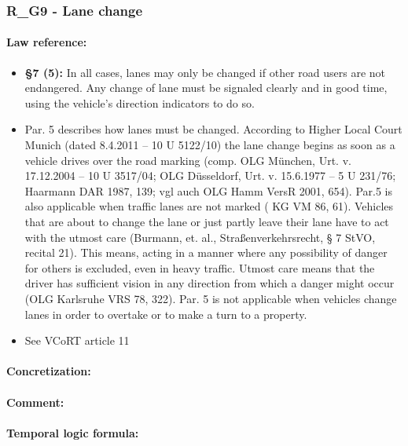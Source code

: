 \subsubsection{R\_G9 - Lane change}
\paragraph{Law reference:}

\begin{itemize}
	\item \textbf{\stvo \S 7 (5):} In all cases, lanes may only be changed if other road users are not endangered. Any change of
	lane must be signaled clearly and in good time, using the vehicle’s direction indicators to do so.
	
	\item Par. 5 describes how lanes must be changed. According to Higher Local Court Munich (dated 8.4.2011
	– 10 U 5122/10) the lane change begins as soon as a vehicle drives over the road marking (comp. OLG
	München, Urt. v. 17.12.2004 – 10 U 3517/04; OLG Düsseldorf, Urt. v. 15.6.1977 – 5 U 231/76;
	Haarmann DAR 1987, 139; vgl auch OLG Hamm VersR 2001, 654). Par.5 is also applicable when traffic
	lanes are not marked ( KG VM 86, 61). Vehicles that are about to change the lane or just partly leave
	their lane have to act with the utmost care (Burmann, et. al., Straßenverkehrsrecht, § 7 StVO, recital
	21). This means, acting in a manner where any possibility of danger for others is excluded, even in
	heavy traffic. Utmost care means that the driver has sufficient vision in any direction from which a
	danger might occur (OLG Karlsruhe VRS 78, 322).
	Par. 5 is not applicable when vehicles change lanes in order to overtake or to make a turn to a
	property.
	
	\item See VCoRT article 11
\end{itemize}

\paragraph{Concretization:}

\paragraph{Comment:}

\paragraph{Temporal logic formula:}



